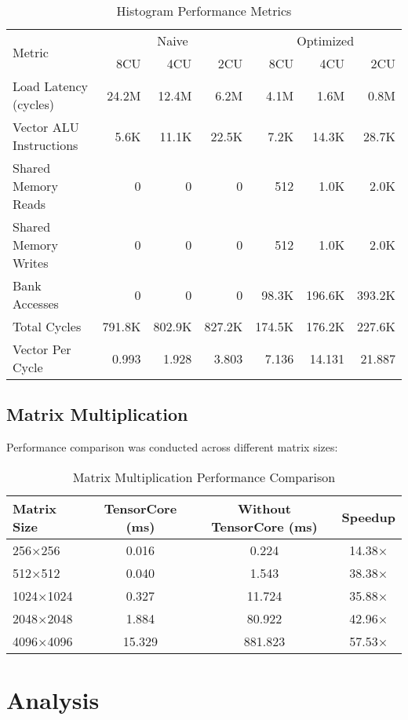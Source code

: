 \documentclass[9pt]{IEEEtran}
\begin{document}
\begin{table}[htbp]
\centering
\footnotesize
\setlength{\tabcolsep}{3pt}
\caption{Histogram Performance Metrics}
\begin{tabular}{@{}lrrrrrr@{}}
\toprule
\multirow{2}{*}{Metric} & \multicolumn{3}{c}{Naive} & \multicolumn{3}{c}{Optimized} \\
\cmidrule(lr){2-4} \cmidrule(lr){5-7}
 & 8CU & 4CU & 2CU & 8CU & 4CU & 2CU \\
\midrule
Load Latency (cycles) & 24.2M & 12.4M & 6.2M & 4.1M & 1.6M & 0.8M \\
Vector ALU Instructions & 5.6K & 11.1K & 22.5K & 7.2K & 14.3K & 28.7K \\
Shared Memory Reads & 0 & 0 & 0 & 512 & 1.0K & 2.0K \\
Shared Memory Writes & 0 & 0 & 0 & 512 & 1.0K & 2.0K \\
Bank Accesses & 0 & 0 & 0 & 98.3K & 196.6K & 393.2K \\
Total Cycles & 791.8K & 802.9K & 827.2K & 174.5K & 176.2K & 227.6K \\
Vector Per Cycle & 0.993 & 1.928 & 3.803 & 7.136 & 14.131 & 21.887 \\
\bottomrule
\end{tabular}
\end{table}

\subsection{Matrix Multiplication}
Performance comparison was conducted across different matrix sizes:

\begin{table}[htbp]
\centering
\caption{Matrix Multiplication Performance Comparison}
\begin{tabular}{@{}lccc@{}}
\toprule
Matrix Size & TensorCore (ms) & Without TensorCore (ms) & Speedup \\
\midrule
256×256 & 0.016 & 0.224 & 14.38× \\
512×512 & 0.040 & 1.543 & 38.38× \\
1024×1024 & 0.327 & 11.724 & 35.88× \\
2048×2048 & 1.884 & 80.922 & 42.96× \\
4096×4096 & 15.329 & 881.823 & 57.53× \\
\bottomrule
\end{tabular}
\end{table}

\section{Analysis}
\end{document}
